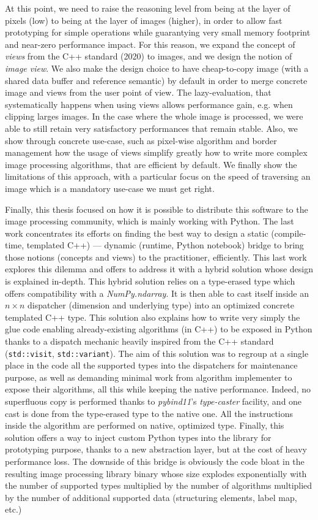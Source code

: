 At this point, we need to raise the reasoning level from being at the layer of pixels (low) to being at the layer of
images (higher), in order to allow fast prototyping for simple operations while guarantying very small memory footprint
and near-zero performance impact. For this reason, we expand the concept of \emph{views} from the C++ standard (2020) to
images, and we design the notion of \emph{image view}. We also make the design choice to have cheap-to-copy image (with
a shared data buffer and reference semantic) by default in order to merge concrete image and views from the user point
of view. The lazy-evaluation, that systematically happens when using views allows performance gain, e.g. when clipping
larges images. In the case where the whole image is processed, we were able to still retain very satisfactory
performances that remain stable. Also, we show through concrete use-case, such as pixel-wise algorithm and border
management how the usage of views simplify greatly how to write more complex image processing algorithms, that are
efficient by default. We finally show the limitations of this approach, with a particular focus on the speed of
traversing an image which is a mandatory use-case we must get right.

Finally, this thesis focused on how it is possible to distribute this software to the image processing community, which
is mainly working with Python. The last work concentrates its efforts on finding the best way to design a static
(compile-time, templated C++) --- dynamic (runtime, Python notebook) bridge to bring those notions (concepts and views)
to the practitioner, efficiently. This last work explores this dilemma and offers to address it with a hybrid solution
whose design is explained in-depth. This hybrid solution relies on a type-erased type which offers compatibility with a
\emph{NumPy.ndarray}. It is then able to cast itself inside an \(n \times n\) dispatcher (dimension and underlying type)
into an optimized concrete templated C++ type. This solution also explains how to write very simply the glue code
enabling already-existing algorithms (in C++) to be exposed in Python thanks to a dispatch mechanic heavily inspired
from the C++ standard (\texttt{std::visit}, \texttt{std::variant}). The aim of this solution was to regroup at a single
place in the code all the supported types into the dispatchers for maintenance purpose, as well as demanding minimal
work from algorithm implementer to expose their algorithms, all this while keeping the native performance. Indeed, no
superfluous copy is performed thanks to \emph{pybind11}'s \emph{type-caster} facility, and one cast is done from the
type-erased type to the native one. All the instructions inside the algorithm are performed on native, optimized type.
Finally, this solution offers a way to inject custom Python types into the library for prototyping purpose, thanks to a
new abstraction layer, but at the cost of heavy performance loss. The downside of this bridge is obviously the code
bloat in the resulting image processing library binary whose size explodes exponentially with the number of supported
types multiplied by the number of algorithms multiplied by the number of additional supported data (structuring
elements, label map, etc.)

